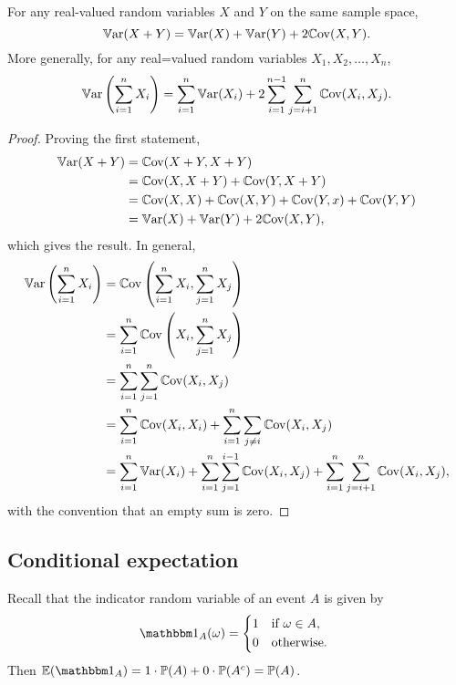 \documentclass[10pt, a4paper]{article}
\begin{document}
\begin{theorem}
    For any real-valued random variables $X$ and $Y$ on the same sample space,
    \[
    \mathbb{V}\mathrm{ar}(X + Y) = \mathbb{V}\mathrm{ar}(X) + \mathbb{V}\mathrm{ar}(Y) + 2\mathbb{C}\mathrm{ov}(X, Y).
    \]
    More generally,
    for any real=valued random variables $X_1, X_2, \dotsc, X_n$,
    \[
    \mathbb{V}\mathrm{ar}\left(\sum_{i = 1}^{n}X_i\right) = \sum_{i = 1}^{n}\mathbb{V}\mathrm{ar}(X_i) + 2\sum_{i = 1}^{n - 1}\sum_{j = i + 1}^{n}\mathbb{C}\mathrm{ov}(X_i, X_j).
    \]
    \begin{proof}
        Proving the first statement,
        \begin{align*}
            \mathbb{V}\mathrm{ar}(X + Y) &= \mathbb{C}\mathrm{ov}(X + Y, X + Y) \\
            &= \mathbb{C}\mathrm{ov}(X, X + Y) + \mathbb{C}\mathrm{ov}(Y, X + Y) \\
            &= \mathbb{C}\mathrm{ov}(X, X) + \mathbb{C}\mathrm{ov}(X, Y) + \mathbb{C}\mathrm{ov}(Y, x) + \mathbb{C}\mathrm{ov}(Y, Y) \\
            &= \mathbb{V}\mathrm{ar}(X) + \mathbb{V}\mathrm{ar}(Y) + 2\mathbb{C}\mathrm{ov}(X, Y),
        \end{align*}
        which gives the result.
        In general,
        \begin{align*}
            \mathbb{V}\mathrm{ar}\left(\sum_{i = 1}^{n}X_i\right) &= \mathbb{C}\mathrm{ov}\left(\sum_{i = 1}^{n}X_i, \sum_{j = 1}^{n}X_j\right) \\
            &= \sum_{i = 1}^{n}\mathbb{C}\mathrm{ov}\left(X_i, \sum_{j = 1}^{n}X_j\right) \\
            &= \sum_{i = 1}^{n}\sum_{j = 1}^{n}\mathbb{C}\mathrm{ov}(X_i, X_j) \\
            &= \sum_{i = 1}^{n}\mathbb{C}\mathrm{ov}(X_i, X_i) + \sum_{i = 1}^{n}\sum_{j \neq i}\mathbb{C}\mathrm{ov}(X_i, X_j) \\
            &= \sum_{i = 1}^{n}\mathbb{V}\mathrm{ar}(X_i) + \sum_{i = 1}^{n}\sum_{j = 1}^{i - 1}\mathbb{C}\mathrm{ov}(X_i, X_j) + \sum_{i = 1}^{n}\sum_{j = i + 1}^{n}\mathbb{C}\mathrm{ov}(X_i, X_j),
        \end{align*}
        with the convention that an empty sum is zero.
    \end{proof}
\end{theorem}

\subsection{Conditional expectation}
Recall that the indicator random variable of an event $A$ is given by
\[
\ind(\omega) = \begin{dcases*}
    1 & if $\omega \in A$, \\
    0 & otherwise.
\end{dcases*}
\]
Then $\E(\ind) = 1 \cdot \P(A) + 0 \cdot \P(A ^ c) = \P(A)$.
\end{document}
